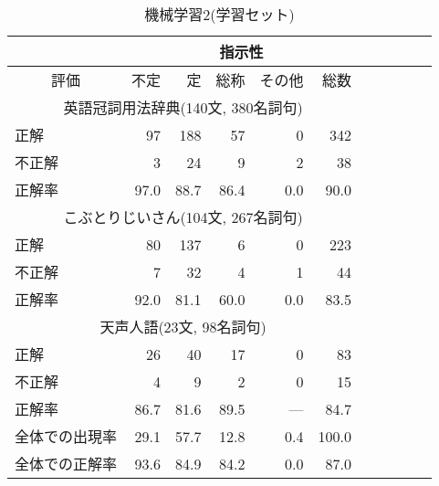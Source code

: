 \begin{table}[t]
\small

\caption{機械学習2(学習セット)}\label{tab:kanshi_m2}

\begin{center}


{

\begin{tabular}[c]{|l|r|r|r|r|r|r|r|r|r|r|} \hline
 & \multicolumn{5}{c|}{指示性}   \\ \hline 
\multicolumn{1}{|c|}{評価}  &  不定  &  定 &  総称 &  その他 & 総数 \\\hline
\multicolumn{6}{|c|}{英語冠詞用法辞典(140文, 380名詞句)} \\ \hline 
   正解   &      97  &     188  &      57  &       0  &     342   \\
  不正解  &       3  &      24  &       9  &       2  &      38   \\\hline
  正解率  &   97.0  &   88.7  &   86.4  &    0.0  &   90.0   \\\hline
\multicolumn{6}{|c|}{こぶとりじいさん(104文, 267名詞句)} \\ \hline 
   正解   &      80  &     137  &       6  &       0  &     223   \\
  不正解  &       7  &      32  &       4  &       1  &      44   \\\hline
  正解率  &   92.0  &   81.1  &   60.0  &    0.0  &   83.5   \\\hline
\multicolumn{6}{|c|}{天声人語(23文, 98名詞句)} \\ \hline 
   正解   &      26  &      40  &      17  &       0  &      83   \\
  不正解  &       4  &       9  &       2  &       0  &      15   \\\hline
  正解率  &   86.7  &   81.6  &   89.5  &     ---  &   84.7   \\\hline
全体での出現率 &  29.1  &  57.7   &  12.8   &  0.4  &  100.0   \\
全体での正解率  &   93.6  &   84.9  &   84.2  &    0.0  &   87.0   \\\hline
\end{tabular}
}
\end{center}
\end{table}

